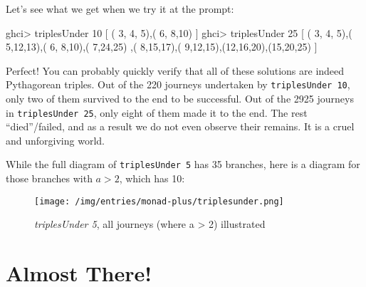 \documentclass[]{article}
\newenvironment{Shaded}{}{}
\newcommand{\DecValTok}[1]{\textcolor[rgb]{0.25,0.63,0.44}{#1}}
\newcommand{\NormalTok}[1]{#1}
\newcommand{\OperatorTok}[1]{\textcolor[rgb]{0.40,0.40,0.40}{#1}}
\begin{document}
Let's see what we get when we try it at the prompt:

\begin{Shaded}
\begin{Highlighting}[]
\NormalTok{ghci}\OperatorTok{\textgreater{}}\NormalTok{ triplesUnder }\DecValTok{10}
\NormalTok{[ ( }\DecValTok{3}\NormalTok{, }\DecValTok{4}\NormalTok{, }\DecValTok{5}\NormalTok{),( }\DecValTok{6}\NormalTok{, }\DecValTok{8}\NormalTok{,}\DecValTok{10}\NormalTok{) ]}
\NormalTok{ghci}\OperatorTok{\textgreater{}}\NormalTok{ triplesUnder }\DecValTok{25}
\NormalTok{[ ( }\DecValTok{3}\NormalTok{, }\DecValTok{4}\NormalTok{, }\DecValTok{5}\NormalTok{),( }\DecValTok{5}\NormalTok{,}\DecValTok{12}\NormalTok{,}\DecValTok{13}\NormalTok{),( }\DecValTok{6}\NormalTok{, }\DecValTok{8}\NormalTok{,}\DecValTok{10}\NormalTok{),( }\DecValTok{7}\NormalTok{,}\DecValTok{24}\NormalTok{,}\DecValTok{25}\NormalTok{)}
\NormalTok{ ,( }\DecValTok{8}\NormalTok{,}\DecValTok{15}\NormalTok{,}\DecValTok{17}\NormalTok{),( }\DecValTok{9}\NormalTok{,}\DecValTok{12}\NormalTok{,}\DecValTok{15}\NormalTok{),(}\DecValTok{12}\NormalTok{,}\DecValTok{16}\NormalTok{,}\DecValTok{20}\NormalTok{),(}\DecValTok{15}\NormalTok{,}\DecValTok{20}\NormalTok{,}\DecValTok{25}\NormalTok{) ]}
\end{Highlighting}
\end{Shaded}

Perfect! You can probably quickly verify that all of these solutions are indeed
Pythagorean triples. Out of the 220 journeys undertaken by
\texttt{triplesUnder\ 10}, only two of them survived to the end to be
successful. Out of the 2925 journeys in \texttt{triplesUnder\ 25}, only eight of
them made it to the end. The rest ``died''/failed, and as a result we do not
even observe their remains. It is a cruel and unforgiving world.

While the full diagram of \texttt{triplesUnder\ 5} has 35 branches, here is a
diagram for those branches with \(a > 2\), which has 10:

\begin{figure}
\centering
\texttt{[image: /img/entries/monad-plus/triplesunder.png]}
\caption{\emph{triplesUnder 5}, all journeys (where a \textgreater{} 2)
illustrated}
\end{figure}

\section{Almost There!}\label{almost-there}
\end{document}
